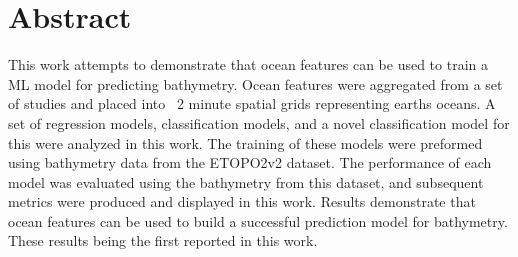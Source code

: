 \section{Abstract}
\setlength{\parindent}{10ex}
This work attempts to demonstrate that ocean features can be used to train a \ac{ML} model for predicting bathymetry.
Ocean features were aggregated from a set of studies and placed into ~2 minute spatial grids representing earths oceans.
A set of regression models, classification models, and a novel classification model for this were analyzed in this work.
The training of these models were preformed using bathymetry data from the ETOPO2v2 dataset.
The performance of each model was evaluated using the bathymetry from this dataset, and subsequent metrics were produced and displayed in this work.
Results demonstrate that ocean features can be used to build a successful prediction model for bathymetry.
These results being the first reported in this work.
